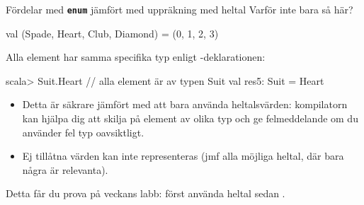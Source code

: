 \begin{Slide}{Fördelar med \texttt{\textbf{enum}} jämfört med uppräkning med heltal}
Varför inte bara så här?
\begin{Code}
val (Spade, Heart, Club, Diamond) = (0, 1, 2, 3)  
\end{Code}  
Alla element har samma specifika typ enligt -deklarationen:  
\begin{REPL}
scala> Suit.Heart              // alla element är av typen Suit 
val res5: Suit = Heart
\end{REPL}

\begin{itemize}
\item Detta är säkrare jämfört med att bara använda heltalsvärden: kompilatorn kan hjälpa dig att skilja på element av olika typ och ge felmeddelande om du använder fel typ oavsiktligt. 
\item Ej tillåtna värden kan inte representeras (jmf alla möjliga heltal, där bara några är relevanta).
\end{itemize}  
Detta får du prova på veckans labb: först använda heltal sedan .
\end{Slide}